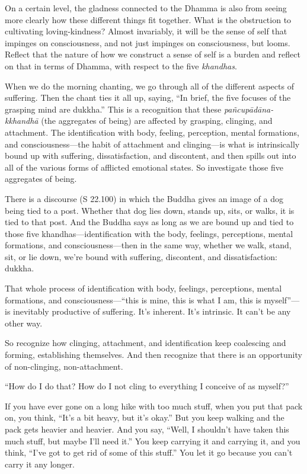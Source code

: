 On a certain level, the gladness connected to the Dhamma is also from
seeing more clearly how these different things fit together. What is the
obstruction to cultivating loving-kindness? Almost invariably, it will
be the sense of self that impinges on consciousness, and not just
impinges on consciousness, but looms. Reflect that the nature of how we
construct a sense of self is a burden and reflect on that in terms of
Dhamma, with respect to the five \emph{khandhas}.

When we do the morning chanting, we go through all of the different
aspects of suffering. Then the chant ties it all up, saying, “In brief,
the five focuses of the grasping mind are dukkha.” This is a recognition
that these \emph{pañcupādāna-kkhandhā} (the aggregates of being) are
affected by grasping, clinging, and attachment. The identification with
body, feeling, perception, mental formations, and consciousness—the
habit of attachment and clinging—is what is intrinsically bound up with
suffering, dissatisfaction, and discontent, and then spills out into all
of the various forms of afflicted emotional states. So investigate those
five aggregates of being.

There is a discourse (S 22.100) in which the Buddha gives an image of a
dog being tied to a post. Whether that dog lies down, stands up, sits,
or walks, it is tied to that post. And the Buddha says as long as we are
bound up and tied to those five khandhas—identification with the body,
feelings, perceptions, mental formations, and consciousness—then in the
same way, whether we walk, stand, sit, or lie down, we’re bound with
suffering, discontent, and dissatisfaction: dukkha.

That whole process of identification with body, feelings, perceptions,
mental formations, and consciousness—“this is mine, this is what I am,
this is myself”—is inevitably productive of suffering. It’s inherent.
It’s intrinsic. It can’t be any other way.

So recognize how clinging, attachment, and identification keep
coalescing and forming, establishing themselves. And then recognize that
there is an opportunity of non-clinging, non-attachment.

“How do I do that? How do I not cling to everything I conceive of as
myself?”

If you have ever gone on a long hike with too much stuff, when you put
that pack on, you think, “It’s a bit heavy, but it’s okay.” But you keep
walking and the pack gets heavier and heavier. And you say, “Well, I
shouldn’t have taken this much stuff, but maybe I’ll need it.” You keep
carrying it and carrying it, and you think, “I’ve got to get rid of some
of this stuff.” You let it go because you can’t carry it any longer.

